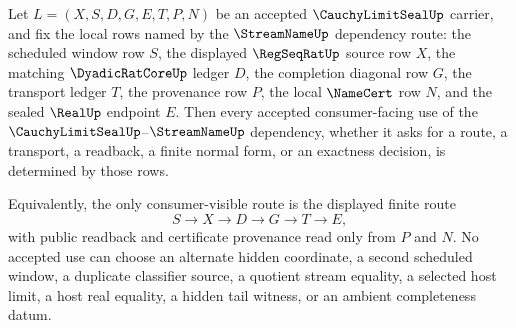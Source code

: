 \begin{corollary}
\label{cor:cauchy-limit-seal-streamname-dependency-determinacy}
Let $L=(X,S,D,G,E,T,P,N)$ be an accepted $\CauchyLimitSealUp$ carrier, and fix the local rows named by the $\StreamNameUp$ dependency route: the scheduled window row $S$, the displayed $\RegSeqRatUp$ source row $X$, the matching $\DyadicRatCoreUp$ ledger $D$, the completion diagonal row $G$, the transport ledger $T$, the provenance row $P$, the local $\NameCert$ row $N$, and the sealed $\RealUp$ endpoint $E$. Then every accepted consumer-facing use of the $\CauchyLimitSealUp$--$\StreamNameUp$ dependency, whether it asks for a route, a transport, a readback, a finite normal form, or an exactness decision, is determined by those rows.

Equivalently, the only consumer-visible route is the displayed finite route
$$
S \to X \to D \to G \to T \to E,
$$
with public readback and certificate provenance read only from $P$ and $N$. No accepted use can choose an alternate hidden coordinate, a second scheduled window, a duplicate classifier source, a quotient stream equality, a selected host limit, a host real equality, a hidden tail witness, or an ambient completeness datum.
\end{corollary}
